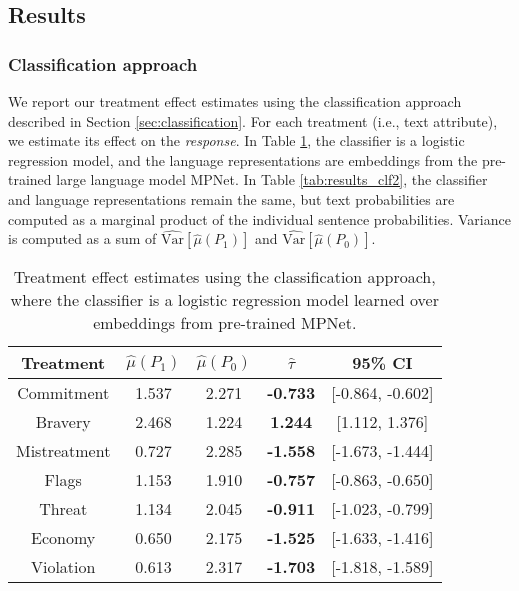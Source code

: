 \documentclass{article}
\begin{document}
\subsection{Results}

\subsubsection{Classification approach}

We report our treatment effect estimates using the classification approach described in Section \ref{sec:classification}. For each treatment (i.e., text attribute), we estimate its effect on the \textit{response}. In Table \ref{tab:results_clf1}, the classifier is a logistic regression model, and the language representations are embeddings from the pre-trained large language model MPNet. In Table \ref{tab:results_clf2}, the classifier and language representations remain the same, but text probabilities are computed as a marginal product of the individual sentence probabilities. Variance is computed as a sum of $\widehat{\text{Var}}[\hat{\mu}(P_1)]$ and $\widehat{\text{Var}}[\hat{\mu}(P_0)]$.

\begin{table}[!ht]
    \centering
    \begin{tabular}{c|cccc}
        \toprule
        Treatment & $\hat{\mu}(P_1)$ & $\hat{\mu}(P_0)$ & $\hat{\tau}$ & 95\% CI \\
        \midrule
        Commitment & 1.537 & 2.271 & \textcolor{red!80!black}{\textbf{-0.733}} & [-0.864, -0.602] \\
        Bravery & 2.468 & 1.224 & \textcolor{green!50!black}{\textbf{1.244}} & [1.112, 1.376] \\
        Mistreatment & 0.727 & 2.285 & \textcolor{red!80!black}{\textbf{-1.558}} & [-1.673, -1.444] \\
        Flags & 1.153 & 1.910 & \textcolor{red!80!black}{\textbf{-0.757}} & [-0.863, -0.650] \\
        Threat & 1.134 & 2.045 & \textcolor{red!80!black}{\textbf{-0.911}} & [-1.023, -0.799] \\
        Economy & 0.650 & 2.175 & \textcolor{red!80!black}{\textbf{-1.525}} & [-1.633, -1.416] \\
        Violation & 0.613 & 2.317 & \textcolor{red!80!black}{\textbf{-1.703}} & [-1.818, -1.589] \\
        \bottomrule
    \end{tabular}
    \caption{Treatment effect estimates using the classification approach, where the classifier is a logistic regression model learned over embeddings from pre-trained MPNet.}
    \label{tab:results_clf1}
\end{table}
\end{document}
